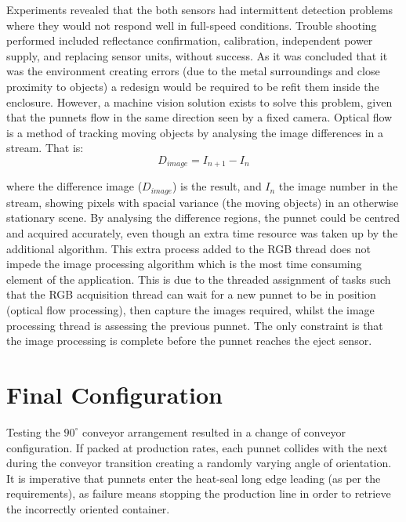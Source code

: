 \documentclass[fleqn,twoside,12pt]{report}
\begin{document}
Experiments revealed that the both sensors had intermittent detection problems where they would not respond well in full-speed conditions. Trouble shooting performed included reflectance confirmation, calibration, independent power supply, and replacing sensor units, without success. As it was concluded that it was the environment creating errors (due to the metal surroundings and close proximity to objects) a redesign would be required to be refit them inside the enclosure. However, a machine vision solution exists to solve this problem, given that the punnets flow in the same direction seen by a fixed camera. Optical flow is a method of tracking moving objects by analysing the image differences in a stream. That is:
\begin{equation}
D_{image} = I_{n+1} - I_n
\end{equation}

where the difference image ($D_{image}$) is the result, and $I_n$ the image number in the stream, showing pixels with spacial variance (the moving objects) in an otherwise stationary scene. By analysing the difference regions, the punnet could be centred and acquired accurately, even though an extra time resource was taken up by the additional algorithm. This extra process added to the RGB thread does not impede the image processing algorithm which is the most time consuming element of the application. This is due to the threaded assignment of tasks such that the RGB acquisition thread can wait for a new punnet to be in position (optical flow processing), then capture the images required, whilst the image processing thread is assessing the previous punnet. The only constraint is that the image processing is complete before the punnet reaches the eject sensor.



 

\section{Final Configuration}


Testing the $90^{\circ}$ conveyor arrangement resulted in a change of conveyor configuration. If packed at production rates, each punnet collides with the next during the conveyor transition creating a randomly varying angle of orientation. It is imperative that punnets enter the heat-seal long edge leading (as per the requirements), as failure means stopping the production line in order to retrieve the incorrectly oriented container.
\end{document}
